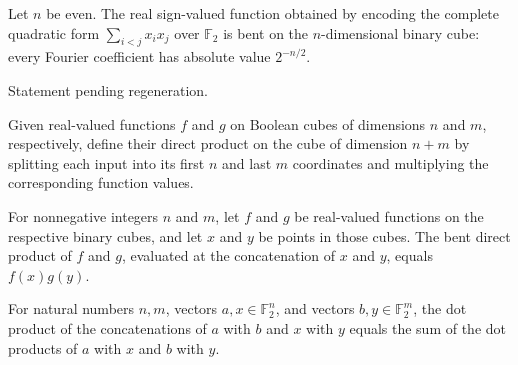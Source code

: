 \begin{theorem}
\label{FABL.isBent_completeQuadratic}
\leanok
{}
Let $n$ be even. The real sign-valued function obtained by encoding the complete
quadratic form $\sum_{i<j}x_i x_j$ over $\mathbb F_2$ is bent on the $n$-dimensional
binary cube: every Fourier coefficient has absolute value $2^{-n/2}$.
\end{theorem}

\begin{theorem}
\label{FABL.isSignValued_completeQuadratic}
\leanok
{}
Statement pending regeneration.
\end{theorem}

\begin{definition}
\label{FABL.bentDirectProduct}
\leanok
{}
Given real-valued functions $f$ and $g$ on Boolean cubes of dimensions $n$ and $m$,
respectively, define their direct product on the cube of dimension $n+m$ by splitting
each input into its first $n$ and last $m$ coordinates and multiplying the corresponding
function values.
\end{definition}

\begin{theorem}
\label{FABL.bentDirectProduct_append}
\leanok
{}
For nonnegative integers $n$ and $m$, let $f$ and $g$ be real-valued functions on the
respective binary cubes, and let $x$ and $y$ be points in those cubes. The bent direct
product of $f$ and $g$, evaluated at the concatenation of $x$ and $y$, equals
$f(x)g(y)$.
\end{theorem}

\begin{theorem}
\leanok
{}
For natural numbers $n,m$, vectors $a,x\in\mathbb{F}_2^n$, and vectors
$b,y\in\mathbb{F}_2^m$, the dot product of the concatenations of $a$ with $b$ and $x$
with $y$ equals the sum of the dot products of $a$ with $x$ and $b$ with $y$.
\end{theorem}

